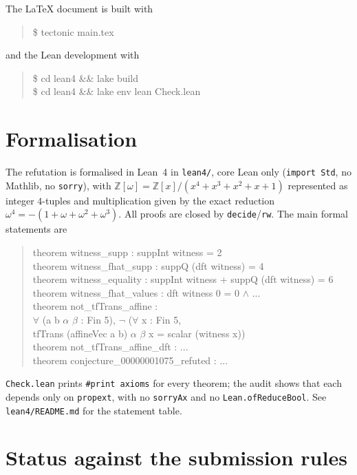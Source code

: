 \documentclass[11pt]{article}
\theoremstyle{definition}
\theoremstyle{remark}
\newcommand{\Z}{\mathbb{Z}}
\begin{document}
The LaTeX document is built with
\begin{quote}\ttfamily
\$ tectonic main.tex
\end{quote}
and the Lean development with
\begin{quote}\ttfamily
\$ cd lean4 \&\& lake build\\
\$ cd lean4 \&\& lake env lean Check.lean
\end{quote}

\section{Formalisation}

The refutation is formalised in Lean~4 in \texttt{lean4/}, core Lean only
(\texttt{import Std}, no Mathlib, no \texttt{sorry}), with
$\Z[\omega]=\Z[x]/(x^4+x^3+x^2+x+1)$ represented as integer $4$-tuples and
multiplication given by the exact reduction
$\omega^4=-(1+\omega+\omega^2+\omega^3)$. All proofs are closed by
\texttt{decide}/\texttt{rw}. The main formal statements are
\begin{quote}\ttfamily\raggedright
theorem witness\_supp : suppInt witness = 2\\
theorem witness\_fhat\_supp : suppQ (dft witness) = 4\\
theorem witness\_equality : suppInt witness + suppQ (dft witness) = 6\\
theorem witness\_fhat\_values : dft witness 0 = 0 \(\wedge\) ...\\[0.4em]
theorem not\_tfTrans\_affine :\\
\hspace*{1em}\(\forall\) (a b \(\alpha\) \(\beta\) : Fin 5), \(\neg\) (\(\forall\) x : Fin 5,\\
\hspace*{2em}tfTrans (affineVec a b) \(\alpha\) \(\beta\) x = scalar (witness x))\\[0.4em]
theorem not\_tfTrans\_affine\_dft : ...\\
theorem conjecture\_00000001075\_refuted : ...
\end{quote}
\texttt{Check.lean} prints \texttt{\#print axioms} for every theorem; the
audit shows that each depends only on \texttt{propext}, with no
\texttt{sorryAx} and no \texttt{Lean.ofReduceBool}. See
\texttt{lean4/README.md} for the statement table.

\section*{Status against the submission rules}
\end{document}
